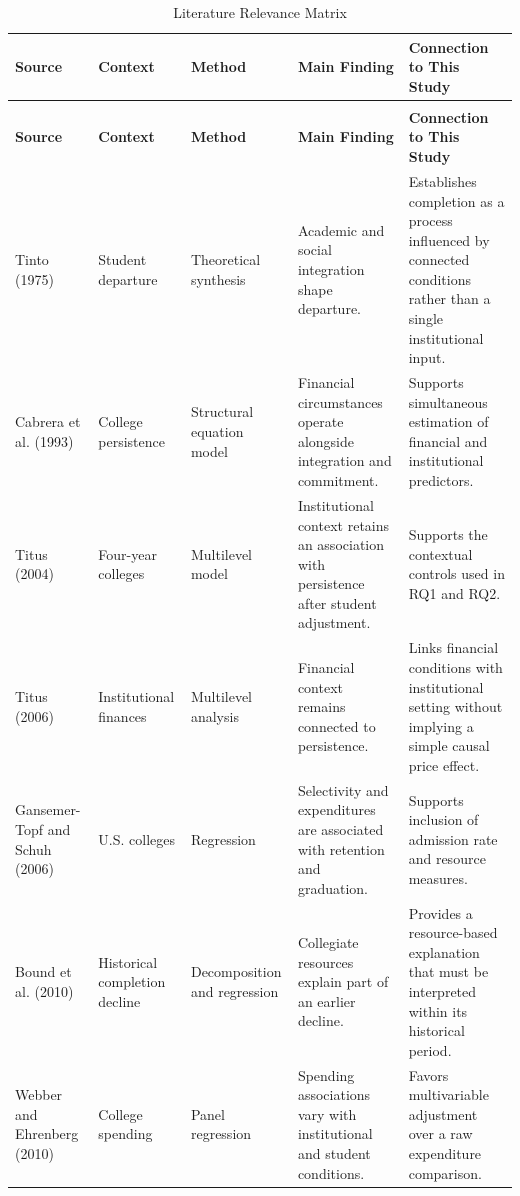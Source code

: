 \documentclass[12pt,a4paper]{article}
\renewcommand{\thetable}{\arabic{table}}
\begin{document}
\small
\begin{longtable}{>{\raggedright\arraybackslash}p{}>{\raggedright\arraybackslash}p{}>{\raggedright\arraybackslash}p{}>{\raggedright\arraybackslash}p{}>{\raggedright\arraybackslash}p{}}
\caption{Literature Relevance Matrix}\label{tab:literature}\\
\toprule
\textbf{Source} & \textbf{Context} & \textbf{Method} & \textbf{Main Finding} & \textbf{Connection to This Study}\\
\midrule
\endfirsthead
\multicolumn{5}{l}{\textbf{Table \thetable\ continued}}\\
\toprule
\textbf{Source} & \textbf{Context} & \textbf{Method} & \textbf{Main Finding} & \textbf{Connection to This Study}\\
\midrule
\endhead
Tinto (1975) & Student departure & Theoretical synthesis & Academic and social integration shape departure. & Establishes completion as a process influenced by connected conditions rather than a single institutional input.\\
\rowcolor{SoftGray} Cabrera et al. (1993) & College persistence & Structural equation model & Financial circumstances operate alongside integration and commitment. & Supports simultaneous estimation of financial and institutional predictors.\\
Titus (2004) & Four-year colleges & Multilevel model & Institutional context retains an association with persistence after student adjustment. & Supports the contextual controls used in RQ1 and RQ2.\\
\rowcolor{SoftGray} Titus (2006) & Institutional finances & Multilevel analysis & Financial context remains connected to persistence. & Links financial conditions with institutional setting without implying a simple causal price effect.\\
Gansemer-Topf and Schuh (2006) & U.S. colleges & Regression & Selectivity and expenditures are associated with retention and graduation. & Supports inclusion of admission rate and resource measures.\\
\rowcolor{SoftGray} Bound et al. (2010) & Historical completion decline & Decomposition and regression & Collegiate resources explain part of an earlier decline. & Provides a resource-based explanation that must be interpreted within its historical period.\\
Webber and Ehrenberg (2010) & College spending & Panel regression & Spending associations vary with institutional and student conditions. & Favors multivariable adjustment over a raw expenditure comparison.\\

\end{longtable}
\end{document}
